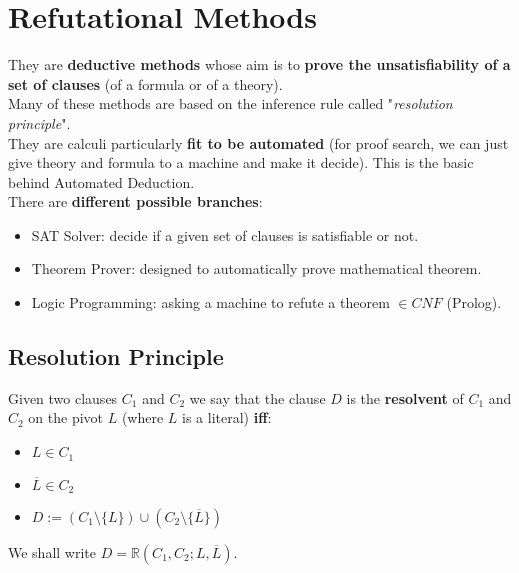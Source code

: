 \chapter{Refutational Methods}

They are \textbf{deductive methods} whose aim is to \textbf{prove the unsatisfiability of a set of clauses} (of a formula or of a theory).\\

Many of these methods are based on the inference rule called "\textit{resolution principle}".\\

They are calculi particularly \textbf{fit to be automated} (for proof search, we can just give theory and formula to a machine and make it decide). This is the basic behind Automated Deduction.\\ 

There are \textbf{different possible branches}:
\begin{itemize}
	\item SAT Solver: decide if a given set of clauses is satisfiable or not.\\
	
	\item Theorem Prover: designed to automatically prove mathematical theorem.\\
	
	\item Logic Programming: asking a machine to refute a theorem $\in CNF$ (Prolog).\\
\end{itemize}

\newpage

\section{Resolution Principle}
Given two clauses $C_1$ and $C_2$ we say that the clause $D$ is the \textbf{resolvent} of $C_1$ and $C_2$ on the pivot $L$ (where $L$ is a literal) \textbf{iff}:
\begin{itemize}
	\item $L \in C_1$
	\item $\overline L \in C_2$
	\item $D:= (C_1 \setminus \{L\}) \cup (C_2 \setminus \{\overline L\})$
\end{itemize}

We shall write $D = \mathbb{R} (C_1, C_2; L, \overline L)$.\\

